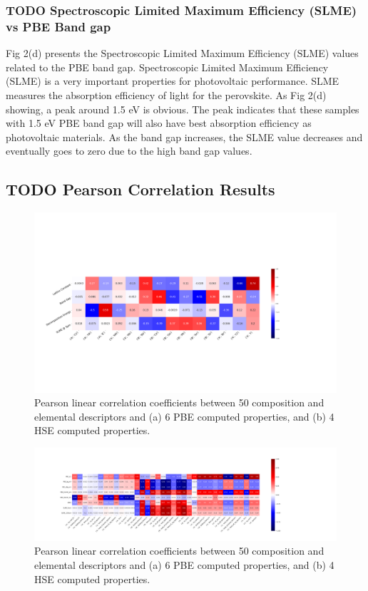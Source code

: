 \documentclass[twoside, twocolumn, 9pt, draft]{article}
\begin{document}
\subsubsection*{{\bfseries\sffamily TODO} Spectroscopic Limited Maximum Efficiency (SLME) vs PBE Band gap}
\label{sec:org6e2b3a5}
Fig 2(d) presents the Spectroscopic Limited Maximum Efficiency (SLME)
values related to the PBE band gap. Spectroscopic Limited Maximum
Efficiency (SLME) is a very important properties for photovoltaic
performance. SLME measures the absorption efficiency of light for the
perovskite. As Fig 2(d) showing, a peak around 1.5 eV is obvious. The
peak indicates that these samples with 1.5 eV PBE band gap will also
have best absorption efficiency as photovoltaic materials. As the band
gap increases, the SLME value decreases and eventually goes to zero due
to the high band gap values.

\subsection*{{\bfseries\sffamily TODO} Pearson Correlation Results}
\label{sec:org0b92079}
\begin{figure}
\centering
\includegraphics[width=.9\linewidth]{PBE_v_comp_pearson2.png}
\caption{\label{fig:pearson} Pearson linear correlation coefficients between 50 composition and elemental descriptors and (a) 6 PBE computed properties, and (b) 4 HSE computed properties.}
\end{figure}
\begin{figure}
\centering
\includegraphics[width=.9\linewidth]{PBE_v_site_prop_pearson.png}
\caption{\label{fig:pearson} Pearson linear correlation coefficients between 50 composition and elemental descriptors and (a) 6 PBE computed properties, and (b) 4 HSE computed properties.}
\end{figure}
\end{document}
